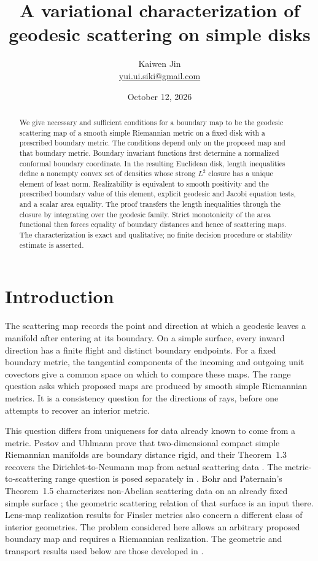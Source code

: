 \documentclass[11pt]{article}
\title{A variational characterization of geodesic scattering on simple disks}
\author{Kaiwen Jin\\\small\href{mailto:yui.ui.siki@gmail.com}{yui.ui.siki@gmail.com}}
\date{October 12, 2026}
\theoremstyle{remark}
\begin{document}
\maketitle
\begin{abstract}
We give necessary and sufficient conditions for a boundary map to be the
geodesic scattering map of a smooth simple Riemannian metric on a fixed disk
with a prescribed boundary metric. The conditions depend only on the proposed
map and that boundary metric. Boundary invariant functions first determine a
normalized conformal boundary coordinate. In the resulting Euclidean disk,
length inequalities define a nonempty convex set of densities whose strong
$L^2$ closure has a unique element of least norm. Realizability is equivalent
to smooth positivity and the prescribed boundary value of this element,
explicit geodesic and Jacobi equation tests, and a scalar area equality.
The proof transfers the length inequalities through the closure by integrating
over the geodesic family. Strict monotonicity of the area functional then
forces equality of boundary distances and hence of scattering maps. The
characterization is exact and qualitative; no finite decision procedure or
stability estimate is asserted.
\end{abstract}

\section{Introduction}\label{sec:intro}
The scattering map records the point and direction at which a geodesic
leaves a manifold after entering at its boundary. On a simple surface,
every inward direction has a finite flight and distinct boundary endpoints.
For a fixed boundary metric, the tangential components of the incoming and
outgoing unit covectors give a common space on which to compare these maps.
The range question asks which proposed maps are produced by smooth simple
Riemannian metrics. It is a consistency question for the directions of rays,
before one attempts to recover an interior metric.

This question differs from uniqueness for data already known to come from
a metric. Pestov and Uhlmann prove that two-dimensional compact simple
Riemannian manifolds are boundary distance rigid, and their
Theorem~1.3 recovers the Dirichlet-to-Neumann map from actual scattering
data \cite{PU}. The metric-to-scattering range question is posed separately
in \cite[Section~15.1, problem~2]{PSU}. Bohr and Paternain's
Theorem~1.5 characterizes non-Abelian scattering data on an already fixed
simple surface \cite{BP}; the geometric scattering relation of that surface
is an input there. Lens-map realization results for Finsler metrics
\cite{BI} also concern a different class of interior geometries.
The problem considered here allows an arbitrary proposed boundary map and
requires a Riemannian realization. The geometric and transport results
used below are those developed in \cite{PSU}.
\end{document}
